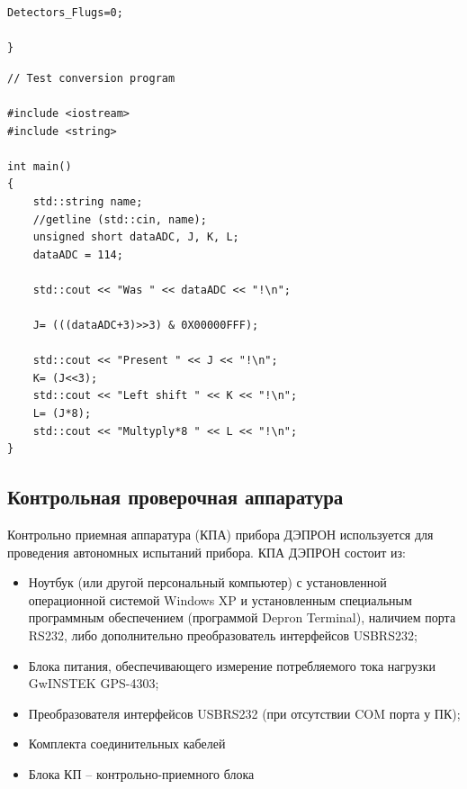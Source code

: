 {\begin{verbatim}
Detectors_Flugs=0;

}  
\end{verbatim}
}


{\small 
\begin{verbatim}
// Test conversion program
	
#include <iostream>
#include <string>

int main()
{
	std::string name;
	//getline (std::cin, name);
	unsigned short dataADC, J, K, L;
	dataADC = 114;
	
	std::cout << "Was " << dataADC << "!\n";
	
	J= (((dataADC+3)>>3) & 0X00000FFF);
	
	std::cout << "Present " << J << "!\n";
	K= (J<<3);
	std::cout << "Left shift " << K << "!\n";
	L= (J*8);
	std::cout << "Multyply*8 " << L << "!\n";
}
\end{verbatim}
}



\subsection{Контрольная проверочная аппаратура}

Контрольно приемная аппаратура (КПА) прибора ДЭПРОН используется для  проведения автономных испытаний прибора. КПА ДЭПРОН состоит из:


\begin{itemize}
	\item 	Ноутбук (или другой персональный компьютер) с установленной операционной системой Windows XP и установленным специальным программным обеспечением (программой Depron Terminal), наличием порта RS232, либо дополнительно преобразователь интерфейсов USBRS232;
	
	
	\item 	Блока питания, обеспечивающего измерение потребляемого тока нагрузки GwINSTEK GPS-4303;
	
	
	\item 	Преобразователя интерфейсов USBRS232 (при отсутствии COM порта у ПК);
	
	
	\item 	Комплекта соединительных кабелей 
	
	
	\item 	Блока КП -- контрольно-приемного блока
	
	
\end{itemize}






